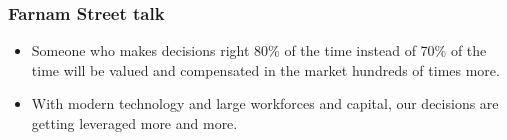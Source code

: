 \begin{frame}[fragile]\frametitle{Farnam Street talk}

\begin{itemize}
\item Someone who makes decisions right 80\% of the time instead of 70\% of the time will be valued and compensated in the market hundreds of times more. 
\item With modern technology and large workforces and capital, our decisions are getting leveraged more and more.
\end{itemize}

\end{frame}
